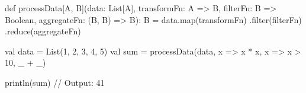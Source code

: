 def processData[A, B](data: List[A], transformFn: A => B, filterFn: B => Boolean, aggregateFn: (B, B) => B): B = {
  data.map(transformFn)
      .filter(filterFn)
      .reduce(aggregateFn)
}

val data = List(1, 2, 3, 4, 5)
val sum = processData(data, x => x * x, x => x > 10, _ + _)

println(sum) // Output: 41
